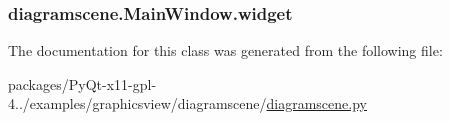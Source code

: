\subsubsection[{widget}]{\setlength{\rightskip}{0pt plus 5cm}diagramscene.\+Main\+Window.\+widget}\label{classdiagramscene_1_1MainWindow_a3919750fb45b6d5dd507a301cd296135}


The documentation for this class was generated from the following file\+:\begin{DoxyCompactItemize}
\item 
packages/\+Py\+Qt-\/x11-\/gpl-\/4../examples/graphicsview/diagramscene/\hyperlink{diagramscene_8py}{diagramscene.\+py}\end{DoxyCompactItemize}
